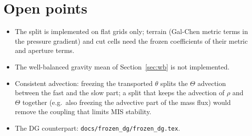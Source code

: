 \documentclass[11pt,a4paper]{article}
\newcommand{\code}[1]{\texttt{#1}}
\begin{document}
\section{Open points}
\begin{itemize}
\item The split is implemented on flat grids only; terrain (Gal-Chen metric terms in the pressure gradient) and
  cut cells need the frozen coefficients of their metric and aperture terms.
\item The well-balanced gravity mean of Section~\ref{sec:wb} is not implemented.
\item Consistent advection: freezing the transported $\theta$ splits the $\Theta$ advection between the fast and
  the slow part; a split that keeps the advection of $\rho$ and $\Theta$ together (e.g.\ also freezing the
  advective part of the mass flux) would remove the coupling that limits MIS stability.
\item The DG counterpart: \code{docs/frozen\_dg/frozen\_dg.tex}.
\end{itemize}
\end{document}
